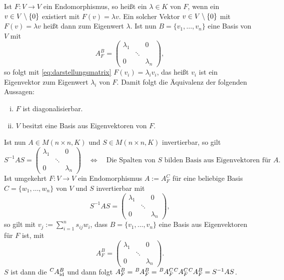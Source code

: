 Ist $F \colon V \rightarrow V$ ein Endomorphismus, so heißt ein $\lambda \in K$  von $F$, wenn ein $v \in V \setminus \{0\}$ existiert mit $F(v) = \lambda v$.
Ein solcher Vektor $v \in V\setminus \{0\}$ mit $F(v) = \lambda v$ heißt dann  zum Eigenwert $\lambda$.
Ist nun $B = \{v_1,\dots,v_n\}$ eine Basis von $V$ mit
\[
	A_F^B =\begin{pmatrix}
	\lambda_1 &  & 0 \\ 
	& \ddots &  \\ 
	0 &  & \lambda_n
	\end{pmatrix},
\]
so folgt mit \eqref{eq:darstellungsmatrix} $F(v_i) = \lambda_i v_i$, das heißt $v_i$ ist ein Eigenvektor zum Eigenwert $\lambda_i$ von $F$.
Damit folgt die Äquivalenz der folgenden Aussagen:
\begin{enumerate}[(i)]
	\item $F$ ist diagonalisierbar.
	\item $V$ besitzt eine Basis aus Eigenvektoren von $F$.
\end{enumerate}
Ist nun $A \in M(n\times n,K)$ und $S \in M(n \times n,K)$ invertierbar, so gilt
\[
	S^{-1}AS = \begin{pmatrix}
	\lambda_1 &  & 0 \\ 
	& \ddots &  \\ 
	0 &  & \lambda_n
	\end{pmatrix} \quad \Leftrightarrow \quad \text{Die Spalten von } S \text{ bilden Basis aus Eigenvektoren für } A.
\]
Ist umgekehrt $F \colon V \rightarrow V$ ein Endomorphismus $A := A_F^C$ für eine beliebige Basis $C = \{w_1,\dots,w_n\}$ von $V$ und $S$ invertierbar mit
\[
	S^{-1}AS = \begin{pmatrix}
	\lambda_1 &  & 0 \\ 
	& \ddots &  \\ 
	0 &  & \lambda_n
	\end{pmatrix},
\]
so gilt mit $v_j := \sum_{i=1}^{n} s_{ij}w_i$, dass $B=\{v_1,\dots,v_n\}$ eine Basis aus Eigenvektoren für $F$ ist, mit
\[
	A_F^B = \begin{pmatrix}
	\lambda_1 &  & 0 \\ 
	& \ddots &  \\ 
	0 &  & \lambda_n
	\end{pmatrix}.
\]
$S$ ist dann die  $\mat{A}{C}{B}{\id}$ und dann folgt $A_F^B = \mat{A}{B}{B}{F} = \mat{A}{B}{C}{F} \mat{A}{C}{C}{F} \mat{A}{C}{B}{F} = S^{-1}AS$.

